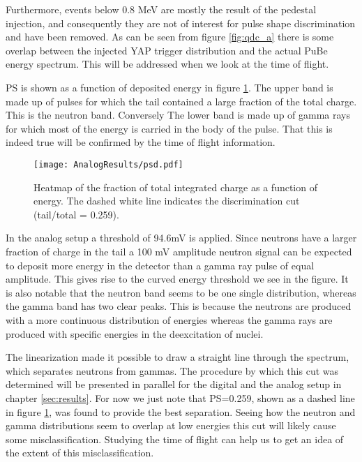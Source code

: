 \documentclass[main.tex]{subfiles}
\begin{document}
Furthermore, events below 0.8 MeV are mostly the result of the pedestal injection, and consequently they are not of interest for pulse shape discrimination and have been removed. As can be seen from figure \ref{fig:qdc_a} there is some overlap between the injected YAP trigger distribution and the actual PuBe energy spectrum. This will be addressed when we look at the time of flight.

PS is shown as a function of deposited energy in figure \ref{fig:psd_a}. The upper band is made up of pulses for which the tail contained a large fraction of the total charge. This is the neutron band. Conversely The lower band is made up of gamma rays for which most of the energy is carried in the body of the pulse. That this is indeed true will be confirmed by the time of flight information.

\begin{figure}[ht]
    \centering
        \texttt{[image: AnalogResults/psd.pdf]}
        \caption{Heatmap of the fraction of total integrated charge as a function of energy. The dashed white line indicates the discrimination cut (tail/total = 0.259).}
        \label{fig:psd_a}
\end{figure}
In the analog setup a threshold of 94.6\si{\milli\volt} is applied. Since neutrons have a larger fraction of charge in the tail a 100 mV amplitude neutron signal can be expected to deposit more energy in the detector than a gamma ray pulse of equal amplitude. This gives rise to the curved energy threshold we see in the figure. It is also notable that the neutron band seems to be one single distribution, whereas the gamma band has two clear peaks. This is because the neutrons are produced with a more continuous distribution of energies whereas the gamma rays are produced with specific energies in the deexcitation of nuclei.

The linearization made it possible to draw a straight line through the spectrum, which separates neutrons from gammas. The procedure by which this cut was determined will be presented in parallel for the digital and the analog setup in chapter \ref{sec:results}. For now we just note that PS=0.259, shown as a dashed line in figure \ref{fig:psd_a}, was found to provide the best separation. Seeing how the neutron and gamma distributions seem to overlap at low energies this cut will likely cause some misclassification. Studying the time of flight can help us to get an idea of the extent of this misclassification.
\end{document}
